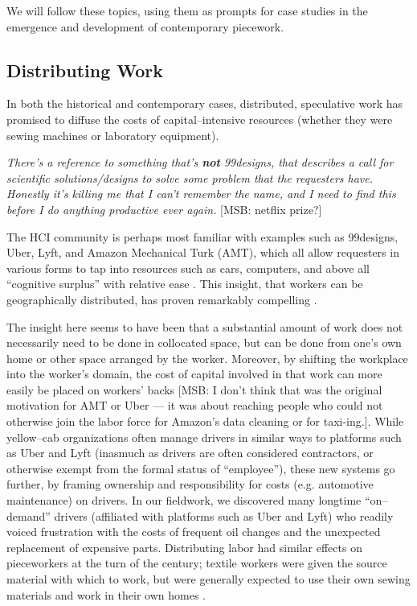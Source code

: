 \documentclass{sigchi}
\newcommand{\msb}[1]{{\color{PineGreen}[MSB: #1]}}
\begin{document}
We will follow these topics, using them as prompts for case studies in
the emergence and
development of contemporary piecework.

\subsection{Distributing Work}
In both the historical and contemporary cases,
distributed, speculative work
has promised
to diffuse the costs of capital--intensive resources
(whether they were sewing machines or laboratory equipment).

\textit{There's a reference to something that's \textbf{not} 99designs,
that describes a call for scientific solutions/designs to solve some problem
that the requesters have.
Honestly it's killing me that I can't remember the name,
and I need to find this before I do anything productive ever again.}
\msb{netflix prize?}

The HCI community is perhaps most familiar with examples such as
99designs,
Uber, Lyft,
and Amazon Mechanical Turk (AMT),
which all allow requesters in various forms to tap into
resources such as
cars,
computers, and above all
``cognitive surplus''
with relative ease
\cite{DillahuntPromise,storiesIraniSilberman,shirky2010cognitive}.
This insight, that
workers can be geographically distributed,
has proven remarkably compelling
\cite{sensitiveTasks}.

The insight here seems to have been that
a substantial amount of work does not necessarily need to be done in collocated space,
but can be done from one's own home or other space arranged by the worker.
Moreover, by shifting the workplace into the worker's domain,
the cost of capital involved in that work can more easily be placed on workers' backs \msb{I don't think that was the original motivation for AMT or Uber --- it was about reaching people who could not otherwise join the labor force for Amazon's data cleaning or for taxi-ing.}.
While yellow--cab organizations often manage drivers in similar ways to platforms such as Uber and Lyft
(inasmuch as drivers are often considered contractors, or otherwise exempt from the formal status of ``employee''),
these new systems go further,
by framing ownership and responsibility for costs
(e.g. automotive maintenance)
on drivers.
In our fieldwork, we discovered many longtime ``on--demand'' drivers
(affiliated with platforms such as Uber and Lyft)
who readily voiced frustration with the costs of
frequent oil changes and the unexpected replacement of expensive parts.
Distributing labor had similar effects on pieceworkers at the turn of the  century;
textile workers were given the source material with which to work,
but were generally expected to use their own sewing materials and work in their own homes
\cite{hapke2004sweatshop}.
\end{document}
